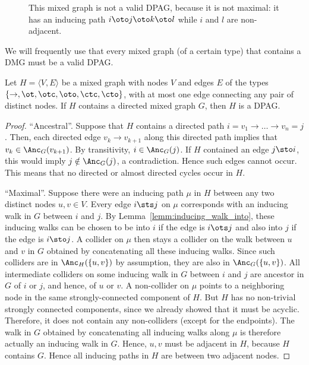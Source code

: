 \begin{figure}\centering
  \caption{This mixed graph is not a valid DPAG, because it is not maximal: 
  it has an inducing path $i \oto j \oto  k \oto l$ while $i$ and $l$ are non-adjacent.\label{fig:nonmaximal_ancestral_graph}}
\end{figure}

We will frequently use that every mixed graph (of a certain type) that contains a DMG must be a valid DPAG.
\begin{Prp}\label{prp:dpag_contains_dmg_is_valid}
Let $H = \langle V,E\rangle$ be a mixed graph with nodes $V$ and edges $E$ of the types $\{\to,\ot,\otc,\oto,\ctc,\cto\}$, with at most one edge connecting any pair of distinct nodes.
If $H$ contains a directed mixed graph $G$, then $H$ is a DPAG.
\end{Prp}
\begin{proof}
  ``Ancestral''. Suppose that $H$ contains a directed path $i = v_1 \to \dots \to v_n = j$.
  Then, each directed edge $v_k \to v_{k+1}$ along this directed path implies that $v_k \in \Anc_G(v_{k+1})$. 
  By transitivity, $i \in \Anc_G(j)$. 
  If $H$ contained an edge $j \sto i$, this would imply $j \notin \Anc_G(j)$, a contradiction. 
  Hence such edges cannot occur.
  This means that no directed or almost directed cycles occur in $H$.

  ``Maximal''.
  Suppose there were an inducing path $\mu$ in $H$ between any two distinct nodes $u,v \in V$. 
  Every edge $i \sts j$ on $\mu$ corresponds with an inducing walk in $G$ between $i$ and $j$. 
  By Lemma~\ref{lemm:inducing_walk_into}, these inducing walks can be chosen to be into $i$ if the edge is $i \ots j$ and also into $j$ if the edge is $i \sto j$. 
  A collider on $\mu$ then stays a collider on the walk between $u$ and $v$ in $G$ obtained by concatenating all these inducing walks.
  Since such colliders are in $\Anc_H(\{u,v\})$ by assumption, they are also in $\Anc_G(\{u,v\})$.
  All intermediate colliders on some inducing walk in $G$ between $i$ and $j$ are ancestor in $G$ of $i$ or $j$, and
  hence, of $u$ or $v$.
  A non-collider on $\mu$ points to a neighboring node in the same strongly-connected component of $H$.
  But $H$ has no non-trivial strongly connected components, since we already showed that it must be acyclic.
  Therefore, it does not contain any non-colliders (except for the endpoints).
  The walk in $G$ obtained by concatenating all inducing walks along $\mu$ is therefore actually an inducing walk in $G$.
  Hence, $u,v$ must be adjacent in $H$, because $H$ contains $G$.
  Hence all inducing paths in $H$ are between two adjacent nodes.
\end{proof}

